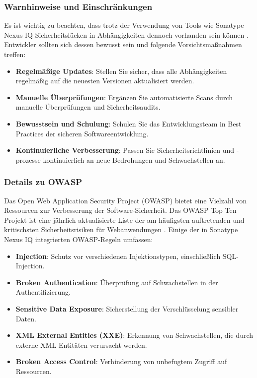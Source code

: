 \subsubsection{Warnhinweise und Einschränkungen}

Es ist wichtig zu beachten, dass trotz der Verwendung von Tools wie Sonatype Nexus IQ Sicherheitslücken in Abhängigkeiten dennoch vorhanden sein können \cite{Sonatype2021}. Entwickler sollten sich dessen bewusst sein und folgende Vorsichtsmaßnahmen treffen:

\begin{itemize}
    \item \textbf{Regelmäßige Updates}: Stellen Sie sicher, dass alle Abhängigkeiten regelmäßig auf die neuesten Versionen aktualisiert werden.
    \item \textbf{Manuelle Überprüfungen}: Ergänzen Sie automatisierte Scans durch manuelle Überprüfungen und Sicherheitsaudits.
    \item \textbf{Bewusstsein und Schulung}: Schulen Sie das Entwicklungsteam in Best Practices der sicheren Softwareentwicklung.
    \item \textbf{Kontinuierliche Verbesserung}: Passen Sie Sicherheitsrichtlinien und -prozesse kontinuierlich an neue Bedrohungen und Schwachstellen an.
\end{itemize}

\subsubsection{Details zu OWASP}

Das Open Web Application Security Project (OWASP) bietet eine Vielzahl von Ressourcen zur Verbesserung der Software-Sicherheit. Das OWASP Top Ten Projekt ist eine jährlich aktualisierte Liste der am häufigsten auftretenden und kritischsten Sicherheitsrisiken für Webanwendungen \cite{OWASP2023}. Einige der in Sonatype Nexus IQ integrierten OWASP-Regeln umfassen:

\begin{itemize}
    \item \textbf{Injection}: Schutz vor verschiedenen Injektionstypen, einschließlich SQL-Injection.
    \item \textbf{Broken Authentication}: Überprüfung auf Schwachstellen in der Authentifizierung.
    \item \textbf{Sensitive Data Exposure}: Sicherstellung der Verschlüsselung sensibler Daten.
    \item \textbf{XML External Entities (XXE)}: Erkennung von Schwachstellen, die durch externe XML-Entitäten verursacht werden.
    \item \textbf{Broken Access Control}: Verhinderung von unbefugtem Zugriff auf Ressourcen.
\end{itemize}

